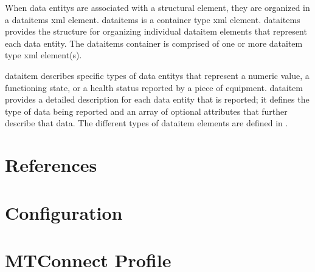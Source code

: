When \glspl{data entity} are associated with a \gls{structural element}, they are organized in a \gls{dataitems} \gls{xml} element.   \gls{dataitems} is a container type \gls{xml} element.  \gls{dataitems} provides the structure for organizing individual \gls{dataitem} elements that represent each \gls{data entity}. The \gls{dataitems} container is comprised of one or more \gls{dataitem} type \gls{xml} element(s).

\gls{dataitem} describes specific types of \glspl{data entity} that represent a numeric value, a functioning state, or a health status reported by a piece of equipment.   \gls{dataitem} provides a detailed description for each \gls{data entity} that is reported; it defines the type of data being reported and an array of optional attributes that further describe that data.   The different types of \gls{dataitem} elements are defined in .




\section{References}
\label{sec:References}


\section{Configuration}
\label{sec:Configuration}







\section{MTConnect Profile}
\label{sec:MTConnect Profile}


